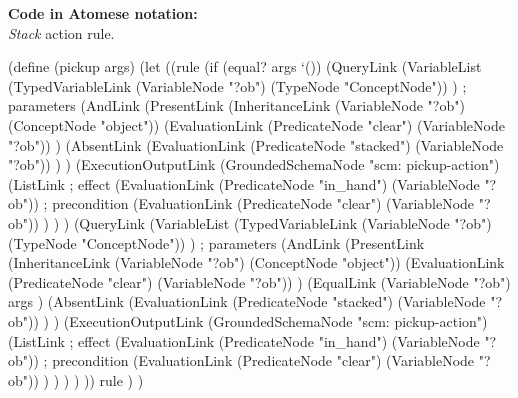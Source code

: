 \begin{footnotesize}
\textbf{Code in Atomese notation:} \\
\textit{Stack} action rule.
\end{footnotesize}

\begin{python}
(define (pickup args)
  (let 
    ((rule
      (if (equal? args `())
        (QueryLink
          (VariableList
            (TypedVariableLink 
              (VariableNode "?ob") 
              (TypeNode "ConceptNode"))
          ) ; parameters
          (AndLink
            (PresentLink
              (InheritanceLink
                (VariableNode "?ob")
                (ConceptNode "object"))
              (EvaluationLink
                (PredicateNode "clear")
                (VariableNode "?ob"))
            )
            (AbsentLink
              (EvaluationLink
                (PredicateNode "stacked")
                (VariableNode "?ob"))
            )
          )
          (ExecutionOutputLink
            (GroundedSchemaNode "scm: pickup-action")
            (ListLink
              ; effect
              (EvaluationLink
                (PredicateNode "in_hand")
                (VariableNode "?ob"))
              ; precondition
              (EvaluationLink
                (PredicateNode "clear")
                (VariableNode "?ob"))
            )
          )
        )
        (QueryLink
          (VariableList
            (TypedVariableLink 
              (VariableNode "?ob") 
              (TypeNode "ConceptNode"))
          ) ; parameters
          (AndLink
            (PresentLink
              (InheritanceLink
                (VariableNode "?ob")
                (ConceptNode "object"))
              (EvaluationLink
                (PredicateNode "clear")
                (VariableNode "?ob"))
            )
            (EqualLink
              (VariableNode "?ob")
              args
            )
            (AbsentLink
              (EvaluationLink
                (PredicateNode "stacked")
                (VariableNode "?ob"))
            )
          )
          (ExecutionOutputLink
            (GroundedSchemaNode "scm: pickup-action")
            (ListLink
              ; effect
              (EvaluationLink
                (PredicateNode "in_hand")
                (VariableNode "?ob"))
              ; precondition
              (EvaluationLink
                (PredicateNode "clear")
                (VariableNode "?ob"))
            )
          )
        )
      )
    ))
    rule
  )
)
\end{python}

